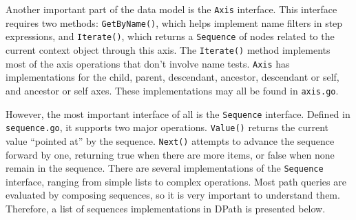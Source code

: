 \documentclass{article}
\begin{document}
Another important part of the data model is the \texttt{Axis} interface. This
interface requires two methods: \texttt{GetByName()}, which helps implement name
filters in step expressions, and \texttt{Iterate()}, which returns a
\texttt{Sequence} of nodes related to the current context object through this
axis. The \texttt{Iterate()} method implements most of the axis operations that
don't involve name tests. \texttt{Axis} has implementations for the child,
parent, descendant, ancestor, descendant or self, and ancestor or self axes.
These implementations may all be found in \texttt{axis.go}.

However, the most important interface of all is the \texttt{Sequence} interface.
Defined in \texttt{sequence.go}, it supports two major operations.
\texttt{Value()} returns the current value ``pointed at'' by the sequence.
\texttt{Next()} attempts to advance the sequence forward by one, returning true
when there are more items, or false when none remain in the sequence. There are
several implementations of the \texttt{Sequence} interface, ranging from simple
lists to complex operations. Most path queries are evaluated by composing
sequences, so it is very important to understand them. Therefore, a list of
sequences implementations in DPath is presented below.
\end{document}
